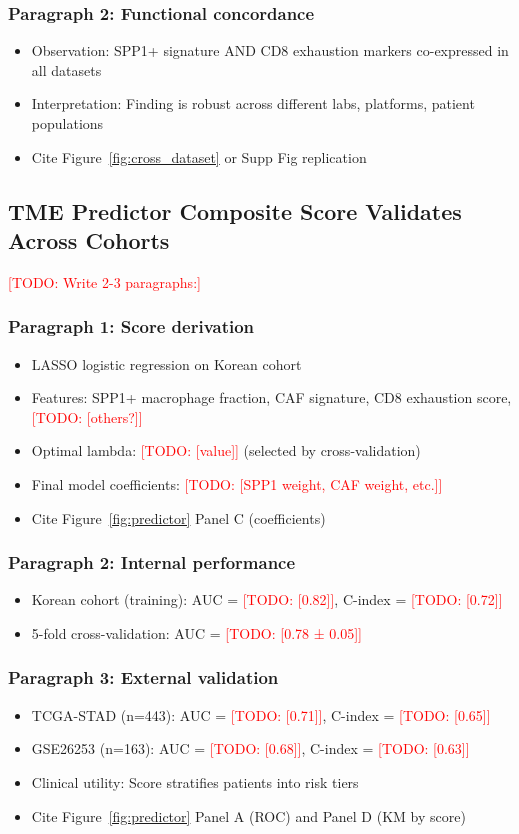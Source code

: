 \documentclass[12pt,oneside]{article}
\newcommand{\TODO}[1]{\textcolor{red}{[TODO: #1]}}
\newcommand{\FIG}[1]{Figure~\ref{fig:#1}}
\begin{document}
\subsubsection*{Paragraph 2: Functional concordance}
\begin{itemize}
    \item Observation: SPP1+ signature AND CD8 exhaustion markers co-expressed in all datasets
    \item Interpretation: Finding is robust across different labs, platforms, patient populations
    \item Cite \FIG{cross_dataset} or Supp Fig replication
\end{itemize}

\subsection{TME Predictor Composite Score Validates Across Cohorts}
\TODO{Write 2-3 paragraphs:}

\subsubsection*{Paragraph 1: Score derivation}
\begin{itemize}
    \item LASSO logistic regression on Korean cohort
    \item Features: SPP1+ macrophage fraction, CAF signature, CD8 exhaustion score, \TODO{[others?]}
    \item Optimal lambda: \TODO{[value]} (selected by cross-validation)
    \item Final model coefficients: \TODO{[SPP1 weight, CAF weight, etc.]}
    \item Cite \FIG{predictor} Panel C (coefficients)
\end{itemize}

\subsubsection*{Paragraph 2: Internal performance}
\begin{itemize}
    \item Korean cohort (training): AUC = \TODO{[0.82]}, C-index = \TODO{[0.72]}
    \item 5-fold cross-validation: AUC = \TODO{[0.78 ± 0.05]}
\end{itemize}

\subsubsection*{Paragraph 3: External validation}
\begin{itemize}
    \item TCGA-STAD (n=443): AUC = \TODO{[0.71]}, C-index = \TODO{[0.65]}
    \item GSE26253 (n=163): AUC = \TODO{[0.68]}, C-index = \TODO{[0.63]}
    \item Clinical utility: Score stratifies patients into risk tiers
    \item Cite \FIG{predictor} Panel A (ROC) and Panel D (KM by score)
\end{itemize}
\end{document}
